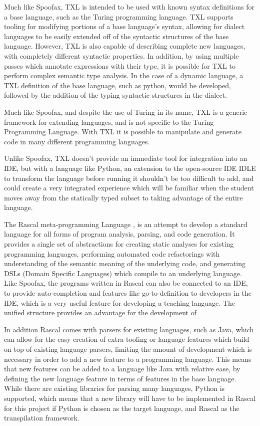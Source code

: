 Much like Spoofax, TXL is intended to be used with known syntax definitions for
a base language, such as the Turing programming language. TXL supports tooling
for modifying portions of a base language’s syntax, allowing for dialect
languages to be easily extended off of the syntactic structures of the base
language. However, TXL is also capable of describing complete new languages,
with completely different syntactic properties. In addition, by using multiple
passes which annotate expressions with their type, it is possible for TXL to
perform complex semantic type analysis. In the case of a dynamic language, a TXL
definition of the base language, such as python, would be developed, followed by
the addition of the typing syntactic structures in the dialect.

Much like Spoofax, and despite the use of Turing in its name, TXL is a generic
framework for extending languages, and is not specific to the Turing Programming
Language. With TXL it is possible to manipulate and generate code in many
different programming languages.

Unlike Spoofax, TXL doesn’t provide an immediate tool for integration into an
IDE, but with a language like Python, an extension to the open-source IDE IDLE
to transform the language before running it shouldn’t be too difficult to add,
and could create a very integrated experience which will be familiar when the
student moves away from the statically typed subset to taking advantage of the
entire language.

The Rascal meta-programming Language \cite{rascalpaper}, \cite{rascalweb} is an
attempt to develop a standard language for all forms of program analysis,
parsing, and code generation. It provides a single set of abstractions for
creating static analyses for existing programming languages, performing
automated code refactorings with understanding of the semantic meaning of the
underlying code, and generating DSLs (Domain Specific Languages) which compile
to an underlying language. Like Spoofax, the programs written in Rascal can also
be connected to an IDE, to provide auto-completion and features like
go-to-definition to developers in the IDE, which is a very useful feature for
developing a teaching language. The unified structure provides an advantage for
the development of

In addition Rascal comes with parsers for existing languages, such as Java,
which can allow for the easy creation of extra tooling or language features
which build on top of existing language parsers, limiting the amount of
development which is necessary in order to add a new feature to a programming
language. This means that new features can be added to a language like Java with
relative ease, by defining the new language feature in terms of features in the
base language. While there are existing libraries for parsing many languages,
Python is supported, which means that a new library will have to be implemented
in Rascal for this project if Python is chosen as the target language, and
Rascal as the transpilation framework.

